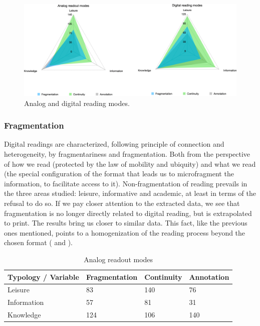 \documentclass[english]{textolivre}
\begin{document}
\begin{figure}[h!]
 \centering
 \begin{minipage}{.95\textwidth}
 \includegraphics[width=\textwidth]{figura01.png}
 \caption{Analog and digital reading modes.}
 \label{fig01}
 \end{minipage}
\end{figure}

\subsubsection{Fragmentation}
Digital readings are characterized, following  principle of connection and heterogeneity, by fragmentariness and fragmentation. Both from the perspective of how we read (protected by the law of mobility and ubiquity) and what we read (the special configuration of the format that leads us to microfragment the information, to facilitate access to it). Non-fragmentation of reading prevails in the three areas studied: leisure, informative and academic, at least in terms of the refusal to do so. If we pay closer attention to the extracted data, we see that fragmentation is no longer directly related to digital reading, but is extrapolated to print. The results bring us closer to similar data. This fact, like the previous ones mentioned, points to a homogenization of the reading process beyond the chosen format ( and ).


\begin{table}[h!]
\centering
\begin{threeparttable}
\caption{Analog readout modes}
\begin{tabular}{llll}
\toprule
Typology / Variable & Fragmentation & Continuity & Annotation \\
\midrule
Leisure & 83 & 140 & 76 \\
Information & 57 & 81 & 31 \\
Knowledge & 124 & 106 & 140 \\
\bottomrule
\end{tabular}
\label{tab06}
\end{threeparttable}
\end{table}
\end{document}
